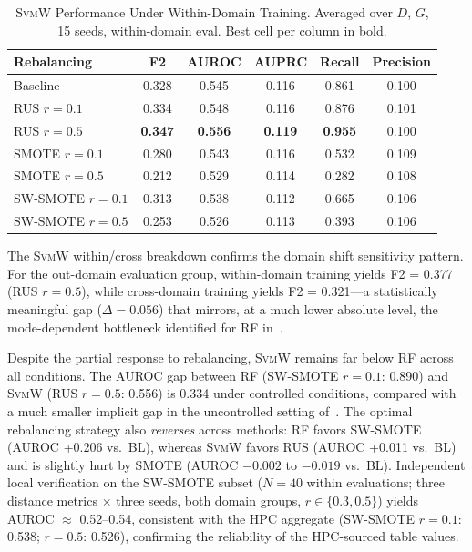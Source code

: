 \documentclass[lettersize,journal]{IEEEtran}
\newcommand{\Impl}[1]{\textsc{#1}}
\begin{document}
\begin{table}[!t]
\caption{\Impl{SvmW} Performance Under Within-Domain Training. Averaged over $D$, $G$, 15 seeds, within-domain eval. Best cell per column in bold.\label{tab:svmw_results}}
\centering
\footnotesize
\begin{tabular}{|l|c|c|c|c|c|}
\hline
Rebalancing & F2 & AUROC & AUPRC & Recall & Precision \\
\hline
Baseline & 0.328 & 0.545 & 0.116 & 0.861 & 0.100 \\
\hline
RUS $r\!=\!0.1$ & 0.334 & 0.548 & 0.116 & 0.876 & 0.101 \\
RUS $r\!=\!0.5$ & \textbf{0.347} & \textbf{0.556} & \textbf{0.119} & \textbf{0.955} & 0.100 \\
\hline
SMOTE $r\!=\!0.1$ & 0.280 & 0.543 & 0.116 & 0.532 & 0.109 \\
SMOTE $r\!=\!0.5$ & 0.212 & 0.529 & 0.114 & 0.282 & 0.108 \\
\hline
SW-SMOTE $r\!=\!0.1$ & 0.313 & 0.538 & 0.112 & 0.665 & 0.106 \\
SW-SMOTE $r\!=\!0.5$ & 0.253 & 0.526 & 0.113 & 0.393 & 0.106 \\
\hline
\end{tabular}
\end{table}

The \Impl{SvmW} within/cross breakdown confirms the domain shift sensitivity pattern.
For the out-domain evaluation group, within-domain training yields F2 = 0.377 (RUS $r{=}0.5$), while cross-domain training yields F2 = 0.321---a statistically meaningful gap ($\Delta = 0.056$) that mirrors, at a much lower absolute level, the mode-dependent bottleneck identified for RF in~\cite{nakagama2026tiv}.

Despite the partial response to rebalancing, \Impl{SvmW} remains far below RF across all conditions.
The AUROC gap between RF (SW-SMOTE $r{=}0.1$: 0.890) and \Impl{SvmW} (RUS $r{=}0.5$: 0.556) is 0.334 under controlled conditions, compared with a much smaller implicit gap in the uncontrolled setting of~\cite{nakagama2025iv}.
The optimal rebalancing strategy also \emph{reverses} across methods: RF favors SW-SMOTE (AUROC +0.206 vs.\ BL), whereas \Impl{SvmW} favors RUS (AUROC +0.011 vs.\ BL) and is slightly hurt by SMOTE (AUROC $-0.002$ to $-0.019$ vs.\ BL).
Independent local verification on the SW-SMOTE subset ($N{=}40$ within evaluations; three distance metrics $\times$ three seeds, both domain groups, $r \in \{0.3, 0.5\}$) yields AUROC $\approx$ 0.52--0.54, consistent with the HPC aggregate (SW-SMOTE $r{=}0.1$: 0.538; $r{=}0.5$: 0.526), confirming the reliability of the HPC-sourced table values.
\end{document}
